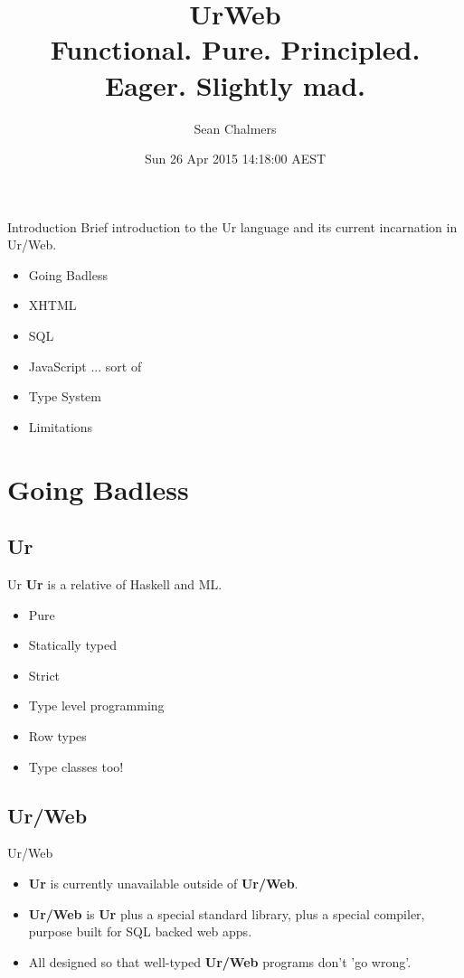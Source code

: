 \documentclass[aspectratio=169]{beamer}
\title[Introduction to UrWeb]{UrWeb\\Functional. Pure. Principled. Eager. Slightly mad.}
\author{Sean Chalmers}
\date{Sun 26 Apr 2015 14:18:00 AEST}
\begin{document}
\begin{frame}
\titlepage
\end{frame}


\begin{frame}{Introduction}
Brief introduction to the Ur language and its current incarnation in Ur/Web.

\begin{itemize}
\item Going Badless
\item XHTML
\item SQL
\item JavaScript ... sort of
\item Type System
\item Limitations
\end{itemize}
\end{frame}

\section{Going Badless}
\subsection{Ur}

\begin{frame}{Ur}
\textbf{Ur} is a relative of Haskell and ML.

\begin{itemize}
\item Pure
\item Statically typed
\item Strict
\item Type level programming
\item Row types
\item Type classes too!
\end{itemize}
\end{frame}

\subsection{Ur/Web}
\begin{frame}{Ur/Web}

\begin{itemize}
\item \textbf{Ur} is currently unavailable outside of \textbf{Ur/Web}.
\item \textbf{Ur/Web} is \textbf{Ur} plus a special standard library,
 plus a special compiler, purpose built for SQL backed web apps.
\item All designed so that well-typed \textbf{Ur/Web} programs don't 'go wrong'.
\end{itemize}
\end{frame}
\end{document}
